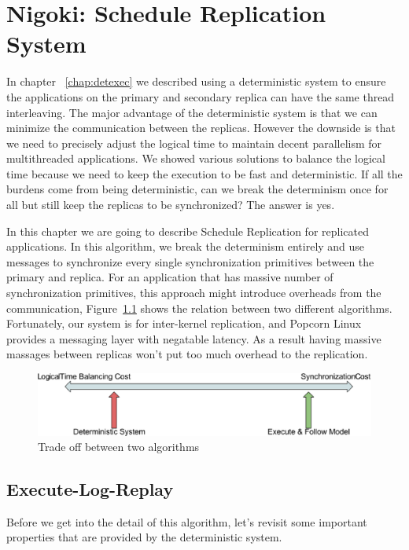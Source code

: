 \chapter{Nigoki: Schedule Replication System} \label{chap:schedrep}
In chapter ~\ref{chap:detexec} we described using a deterministic system to ensure the applications on the primary and secondary replica can have the same thread interleaving. The major advantage of the deterministic system is that we can minimize the communication between the replicas. However the downside is that we need to precisely adjust the logical time to maintain decent parallelism for multithreaded applications. We showed various solutions to balance the logical time because we need to keep the execution to be fast and deterministic. If all the burdens come from being deterministic, can we break the determinism once for all but still keep the replicas to be synchronized? The answer is yes.

In this chapter we are going to describe Schedule Replication for replicated applications. In this algorithm, we break the determinism entirely and use messages to synchronize every single synchronization primitives between the primary and replica. For an application that has massive number of synchronization primitives, this approach might introduce overheads from the communication, Figure~\ref{f:tradeoff} shows the relation between two different algorithms. Fortunately, our system is for inter-kernel replication, and Popcorn Linux provides a messaging layer with negatable latency. As a result having massive massages between replicas won't put too much overhead to the replication.

\begin{figure}
\centering
\includegraphics[width=0.8\columnwidth]{figures/tradeoff}
\caption{Trade off between two algorithms}
\label{f:tradeoff}
\end{figure}

\section{Execute-Log-Replay}
Before we get into the detail of this algorithm, let's revisit some important properties that are provided by the deterministic system.

